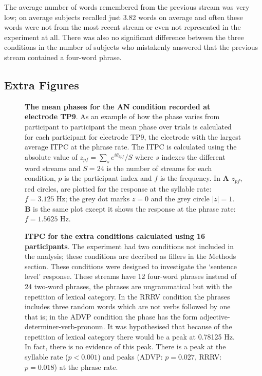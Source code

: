 \documentclass[11pt,a4wide]{article}
\begin{document}
The average number of words remembered from the previous stream was
very low; on average subjects recalled just 3.82 words on average and
often these words were not from the most recent stream or even not
represented in the experiment at all. There was also no significant
difference between the three conditions in the number of subjects who
mistakenly answered that the previous stream contained a four-word
phrase.

\newpage


\subsection*{Extra Figures}

 \begin{figure}[hp]

\caption{\textbf{The mean phases for the AN condition recorded at
    electrode TP9}. As an example of how the phase varies from
  participant to participant the mean phase over trials is calculated
  for each participant for electrode TP9, the electrode with the
  largest average ITPC at the phrase rate. The ITPC is calculated
  using the absolute value of $z_{pf}=\sum_s e^{i\theta_{kpf}}/S$
  where $s$ indexes the different word streams and $S=24$ is the
  number of streams for each condition, $p$ is the participant index
  and $f$ is the frequency. In \textbf{A} $z_{pf}$, red circles,
  are plotted for the response at the syllable rate: $f=3.125$ Hz; the
  grey dot marks $z=0$ and the grey circle $|z|=1$. \textbf{B} is the
  same plot except it shows the response at the phrase rate: $f=1.5625$
  Hz. \label{fig:phases}}
\end{figure}

 \begin{figure}[hp]

\caption{\textbf{ITPC for the extra conditions calculated using 16
    participants}. The experiment had two conditions not included in
  the analysis; these conditions are decribed as fillers in the
  Methods section. These conditions were designed to investigate the
  `sentence level' response. These streams have 12 four-word phrases
  instead of 24 two-word phrases, the phrases are ungrammatical but
  with the repetition of lexical category. In the RRRV condition the
  phrases includes three random words which are not verbs followed by
  one that is; in the ADVP condition the phase has the form
  adjective-determiner-verb-pronoun.  It was hypothesised that because
  of the repetition of lexical category there would be a peak at
  0.78125 Hz. In fact, there is no evidence of this peak. There is a
  peak at the syllable rate ($p<0.001$) and peaks (ADVP: $p=0.027$,
  RRRV: $p=0.018$) at the phrase rate.}
\label{fig:Fig1}
\end{figure}


 
\end{document}
